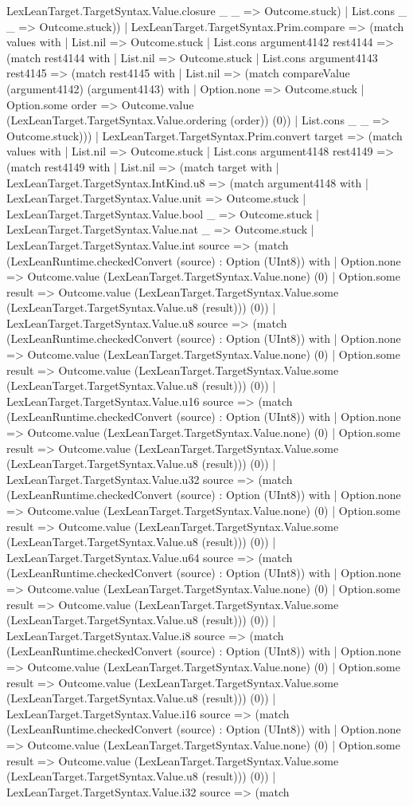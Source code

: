 \documentclass[11pt]{article}
\begin{document}
LexLeanTarget.TargetSyntax.Value.closure \_ \_ => Outcome.stuck) | List.cons \_ \_ => Outcome.stuck)) | LexLeanTarget.TargetSyntax.Prim.compare => (match values with | List.nil => Outcome.stuck | List.cons argument4142 rest4144 => (match rest4144 with | List.nil => Outcome.stuck | List.cons argument4143 rest4145 => (match rest4145 with | List.nil => (match compareValue (argument4142) (argument4143) with | Option.none => Outcome.stuck | Option.some order => Outcome.value (LexLeanTarget.TargetSyntax.Value.ordering (order)) (0)) | List.cons \_ \_ => Outcome.stuck))) | LexLeanTarget.TargetSyntax.Prim.convert target => (match values with | List.nil => Outcome.stuck | List.cons argument4148 rest4149 => (match rest4149 with | List.nil => (match target with | LexLeanTarget.TargetSyntax.IntKind.u8 => (match argument4148 with | LexLeanTarget.TargetSyntax.Value.unit => Outcome.stuck | LexLeanTarget.TargetSyntax.Value.bool \_ => Outcome.stuck | LexLeanTarget.TargetSyntax.Value.nat \_ => Outcome.stuck | LexLeanTarget.TargetSyntax.Value.int source => (match (LexLeanRuntime.checkedConvert (source) : Option (UInt8)) with | Option.none => Outcome.value (LexLeanTarget.TargetSyntax.Value.none) (0) | Option.some result => Outcome.value (LexLeanTarget.TargetSyntax.Value.some (LexLeanTarget.TargetSyntax.Value.u8 (result))) (0)) | LexLeanTarget.TargetSyntax.Value.u8 source => (match (LexLeanRuntime.checkedConvert (source) : Option (UInt8)) with | Option.none => Outcome.value (LexLeanTarget.TargetSyntax.Value.none) (0) | Option.some result => Outcome.value (LexLeanTarget.TargetSyntax.Value.some (LexLeanTarget.TargetSyntax.Value.u8 (result))) (0)) | LexLeanTarget.TargetSyntax.Value.u16 source => (match (LexLeanRuntime.checkedConvert (source) : Option (UInt8)) with | Option.none => Outcome.value (LexLeanTarget.TargetSyntax.Value.none) (0) | Option.some result => Outcome.value (LexLeanTarget.TargetSyntax.Value.some (LexLeanTarget.TargetSyntax.Value.u8 (result))) (0)) | LexLeanTarget.TargetSyntax.Value.u32 source => (match (LexLeanRuntime.checkedConvert (source) : Option (UInt8)) with | Option.none => Outcome.value (LexLeanTarget.TargetSyntax.Value.none) (0) | Option.some result => Outcome.value (LexLeanTarget.TargetSyntax.Value.some (LexLeanTarget.TargetSyntax.Value.u8 (result))) (0)) | LexLeanTarget.TargetSyntax.Value.u64 source => (match (LexLeanRuntime.checkedConvert (source) : Option (UInt8)) with | Option.none => Outcome.value (LexLeanTarget.TargetSyntax.Value.none) (0) | Option.some result => Outcome.value (LexLeanTarget.TargetSyntax.Value.some (LexLeanTarget.TargetSyntax.Value.u8 (result))) (0)) | LexLeanTarget.TargetSyntax.Value.i8 source => (match (LexLeanRuntime.checkedConvert (source) : Option (UInt8)) with | Option.none => Outcome.value (LexLeanTarget.TargetSyntax.Value.none) (0) | Option.some result => Outcome.value (LexLeanTarget.TargetSyntax.Value.some (LexLeanTarget.TargetSyntax.Value.u8 (result))) (0)) | LexLeanTarget.TargetSyntax.Value.i16 source => (match (LexLeanRuntime.checkedConvert (source) : Option (UInt8)) with | Option.none => Outcome.value (LexLeanTarget.TargetSyntax.Value.none) (0) | Option.some result => Outcome.value (LexLeanTarget.TargetSyntax.Value.some (LexLeanTarget.TargetSyntax.Value.u8 (result))) (0)) | LexLeanTarget.TargetSyntax.Value.i32 source => (match 
\end{document}
